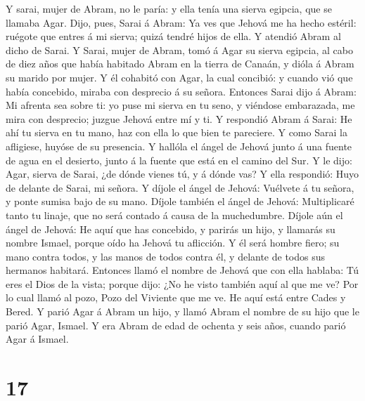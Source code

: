  Y sarai, mujer de Abram, no le paría: y ella tenía una
sierva egipcia, que se llamaba Agar.  Dijo, pues, Sarai á
Abram: Ya ves que Jehová me ha hecho estéril: ruégote que entres á mi
sierva; quizá tendré hijos de ella. Y atendió Abram al dicho de Sarai.
 Y Sarai, mujer de Abram, tomó á Agar su sierva egipcia, al
cabo de diez años que había habitado Abram en la tierra de Canaán, y
dióla á Abram su marido por mujer.  Y él cohabitó con Agar,
la cual concibió: y cuando vió que había concebido, miraba con desprecio
á su señora.  Entonces Sarai dijo á Abram: Mi afrenta sea
sobre ti: yo puse mi sierva en tu seno, y viéndose embarazada, me mira
con desprecio; juzgue Jehová entre mí y ti.  Y respondió
Abram á Sarai: He ahí tu sierva en tu mano, haz con ella lo que bien te
pareciere. Y como Sarai la afligiese, huyóse de su presencia.
 Y hallóla el ángel de Jehová junto á una fuente de agua en
el desierto, junto á la fuente que está en el camino del Sur.
 Y le dijo: Agar, sierva de Sarai, ¿de dónde vienes tú, y á
dónde vas? Y ella respondió: Huyo de delante de Sarai, mi señora.
 Y díjole el ángel de Jehová: Vuélvete á tu señora, y ponte
sumisa bajo de su mano.  Díjole también el ángel de Jehová:
Multiplicaré tanto tu linaje, que no será contado á causa de la
muchedumbre.  Díjole aún el ángel de Jehová: He aquí que
has concebido, y parirás un hijo, y llamarás su nombre Ismael, porque
oído ha Jehová tu aflicción.  Y él será hombre fiero; su
mano contra todos, y las manos de todos contra él, y delante de todos
sus hermanos habitará.  Entonces llamó el nombre de Jehová
que con ella hablaba: Tú eres el Dios de la vista; porque dijo: ¿No he
visto también aquí al que me ve?  Por lo cual llamó al
pozo, Pozo del Viviente que me ve. He aquí está entre Cades y Bered.
 Y parió Agar á Abram un hijo, y llamó Abram el nombre de
su hijo que le parió Agar, Ismael.  Y era Abram de edad de
ochenta y seis años, cuando parió Agar á Ismael.

\hypertarget{section-16}{%
\section{17}\label{section-16}}

